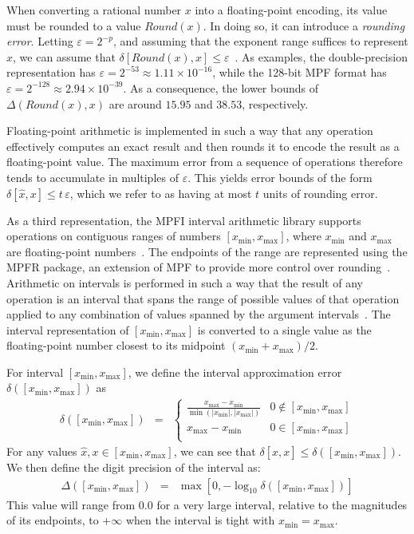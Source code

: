 \documentclass[letterpaper,USenglish,cleveref, autoref, thm-restate]{lipics-v2021}
\newcommand{\approximate}[1]{\hat{#1}}
\newcommand{\approxx}{\approximate{x}}
\newcommand{\round}{\mathit{Round}}
\newcommand{\aerror}{\delta}
\newcommand{\digitprecision}{\Delta}
\newcommand{\roundepsilon}{\varepsilon}
\newcommand{\xmin}{x_{\textrm{min}}}
\newcommand{\xmax}{x_{\textrm{max}}}
\begin{document}
When converting a rational number $x$ into a floating-point encoding, its value must be rounded to a
value $\round(x)$.  In doing so, it can introduce a \emph{rounding
error}.  
Letting $\roundepsilon = 2^{-p}$, and assuming that
the exponent range suffices to represent $x$,
we can assume that
$\aerror[\round(x), x] \leq \roundepsilon$~\cite{knuth:fp:1981}.
As examples, the double-precision representation has $\roundepsilon = 2^{-53} \approx 1.11 \times 10^{-16}$, while the 128-bit MPF format
has $\roundepsilon = 2^{-128} \approx 2.94 \times 10^{-39}$.  As a consequence, the lower bounds of $\digitprecision(\round(x), x)$ are around $15.95$ and $38.53$, respectively.

Floating-point arithmetic is implemented in such a way that any
operation effectively computes an exact result and then rounds it to
encode the result as a floating-point value.  The maximum error from a sequence of operations
therefore tends to accumulate in multiples of $\roundepsilon$.
This yields error bounds of the form $\aerror[\approxx, x] \leq t\,\roundepsilon$,
which we  refer to as having at most $t$ units of
rounding error.

As a third representation, the MPFI interval arithmetic library
supports operations on
contiguous ranges of numbers $[\xmin, \xmax]$, where
$\xmin$ and $\xmax$ are floating-point numbers~\cite{revol:rc:2005}.  The endpoints of the
range are represented using the MPFR package, an extension of MPF to
provide more control over rounding~\cite{fousse:tms:2007}.  Arithmetic on intervals is performed
in such a way that the result of any operation is an interval that
spans the range of possible values of that operation applied to any
combination of values spanned by the argument intervals~\cite{hickey:jacm:2001}.  The interval representation of $[\xmin, \xmax]$ is converted to
a single value as
the floating-point number closest to its midpoint $(\xmin + \xmax)/2$.

For interval $[\xmin, \xmax]$, we define the interval approximation error $\aerror([\xmin, \xmax])$ as
\begin{eqnarray}
\aerror([\xmin, \xmax]) & = & \left\{ \begin{array}{ll}
  \frac{\xmax - \xmin}{\min(|\xmin|, |\xmax|)}  & 0 \not \in [\xmin, \xmax]\\[0.8em]
  \xmax - \xmin &  0 \in [\xmin, \xmax]\\
  \end{array} \right. \label{eqn:interval:error}
\end{eqnarray}
For any values $\approxx, x \in [\xmin, \xmax]$, we can see that
$\aerror[\approxx, x] \leq \aerror([\xmin, \xmax])$.
We then define the digit precision of the interval as:
\begin{eqnarray}
\digitprecision([\xmin, \xmax]) & = & \max[0, -\log_{10} \aerror([\xmin, \xmax])] \label{eqn:interval:digitprecision} 
\end{eqnarray}
This value will range from $0.0$ for a very large interval, relative to the magnitudes of its endpoints, to $+\infty$ when the interval is tight with $\xmin = \xmax$.
\end{document}
